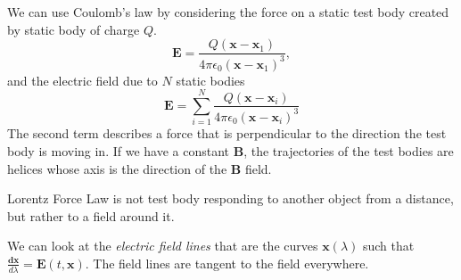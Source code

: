 \begin{example}
    We can use Coulomb's law by considering the force on a static test body created by static body of charge \(Q\).
    \[
        \mathbf{E}  = \frac{Q (\mathbf{x} - \mathbf{x} _1)}{4\pi \epsilon_0 (\mathbf{x} - \mathbf{x} _1)^3},
    \]
    and the electric field due to \(N\) static bodies
    \[
        \mathbf{E} = \sum\limits_{i=1}^{N}\frac{Q (\mathbf{x} - \mathbf{x} _i)}{4\pi \epsilon_0 (\mathbf{x} - \mathbf{x} _i)^3}
    \] 
    The second term describes a force that is perpendicular to the direction the test body is moving in. If we have a constant \(\mathbf{B}\), the trajectories of the test bodies are helices whose axis is the direction of the \(\mathbf{B} \) field.

    Lorentz Force Law is not test body responding to another object from a distance, but rather to a field around it.

    We can look at the \textit{electric field lines} that are the curves \(\mathbf{x} (\lambda)\) such that \(\frac{\mathbf{dx}}{d\lambda} = \mathbf{E} (t, \mathbf{x} )\). The field lines are tangent to the field everywhere.
\end{example}